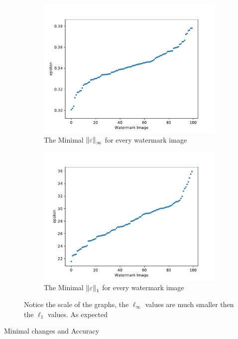 \documentclass{easychair}
\begin{document}
\begin{figure}
  \centering
  \begin{subfigure}{0.4\linewidth}
    \includegraphics[width=\linewidth]{../data/results/problem3/mnist_w_wm_sorted.pdf}
     \caption{The Minimal $\left\lVert\varepsilon\right\rVert_{\infty}$ for every watermark image}
  	\label{fig:minSingleLP}
  \end{subfigure}
  \begin{subfigure}{0.4\linewidth}
    \includegraphics[width=\linewidth]{../data/results/problem2/mnist_w_wm_sorted.pdf}
    \caption{The Minimal $\left\lVert\varepsilon\right\rVert_1$ for every watermark image}
  	\label{fig:minSingleNotLP}
  \end{subfigure}
  \caption{Notice the scale of the graphs, the $\ell_\infty$ values are much smaller then the $\ell_1$ values. As expected}
\label{fig:minSingle}
\end{figure}
\begin{table}
\caption{Minimal changes and Accuracy}
\label{table:singleWatermark}
\end{table}
\end{document}
